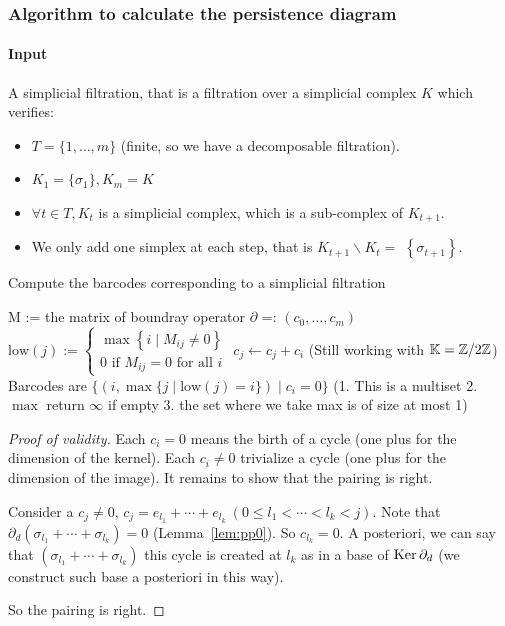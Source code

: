\subsubsection{Algorithm to calculate the persistence diagram}

\paragraph{Input} A simplicial filtration, that is a filtration over a simplicial complex $K$ which verifies:
\begin{itemize}
  \item $T=\{1, \ldots, m\}$ (finite, so we have a decomposable filtration).
  \item $K_1=\{\sigma_1\}, K_m = K$
  \item $\forall t \in T, K_t$ is a simplicial complex,
  which is a sub-complex of $K_{t+1}$.
  \item We only add one simplex at each step,
  that is $K_{t+1} \backslash K_t=$ $\left\{\sigma_{t+1}\right\}$.
\end{itemize}

\begin{algorithm}
  \caption{Compute the barcodes corresponding to a simplicial filtration}
  \begin{algorithmic}
  \State M := the matrix of boundray operator $\partial$ =: $(c_0, \ldots, c_m)$
  \State $\mathrm{low}(j):=\left\{\begin{array}{l}\max \left\{i \mid M_{i j} \neq 0\right\} \\ 0 \text { if } M_{i j}=0 \text { for all } i\end{array}\right.$
  \State $c_j \gets c_j+c_i$ (Still working with $\mathbb{K} = \mathbb{Z}/2\mathbb{Z}$)
  \EndWhile
  \EndFor
  \State Barcodes are $\{(i, \max\{j \mid \mathrm{low}(j)=i\}) \mid c_i = 0\}$
  (1. This is a multiset 2. $\max$ return $\infty$ if empty 3. the set where we take max is of size at most 1)
  \end{algorithmic}
\end{algorithm}

\begin{proof}[Proof of validity]
Each $c_i = 0$ means the birth of a cycle (one plus for the dimension of the kernel).
Each $c_i \not= 0$ trivialize a cycle (one plus for the dimension of the image).
It remains to show that the pairing is right.

Consider a $c_j \not= 0$, $c_j = e_{l_1} + \cdots + e_{l_k}~(0\le l_1 < \cdots < l_k < j)$.
Note that $\partial_d (\sigma_{l_1} + \cdots + \sigma_{l_k}) = 0$ (Lemma~\ref{lem:pp0}).
So $c_{l_k} = 0$. A posteriori, we can say that $(\sigma_{l_1} + \cdots + \sigma_{l_k})$
this cycle is created at $l_k$ as in a base of $\operatorname{Ker} \partial_d$ (we construct
such base a posteriori in this way).

So the pairing is right.

\end{proof}

